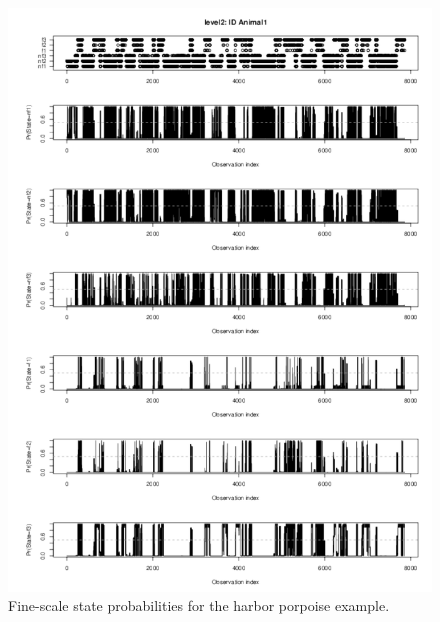 \documentclass[12pt]{article}\usepackage[]{graphicx}\usepackage[]{color}
\begin{document}
\begin{figure}[htbp]
  \centering
  \includegraphics[width=\textwidth]{plot_harborPorpoiseStates002.pdf}
  \caption{Fine-scale state probabilities for the harbor porpoise example.}
  \label{fig:hpLevel2}
\end{figure}
\end{document}
